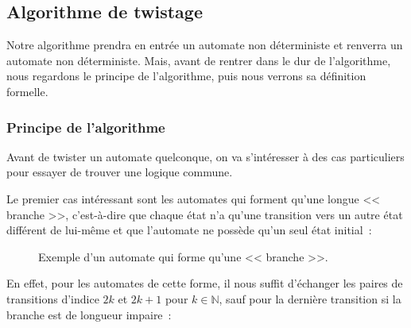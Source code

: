 \subsection{Algorithme de twistage}

Notre algorithme prendra en entrée un automate non déterministe et renverra un
automate non déterministe. Mais, avant de rentrer dans le dur de l'algorithme,
nous regardons le principe de l'algorithme, puis nous verrons sa définition
formelle.

\subsubsection{Principe de l'algorithme}

Avant de twister un automate quelconque, on va s'intéresser à des cas
particuliers pour essayer de trouver une logique commune.

\vphantom{}

Le premier cas intéressant sont les automates qui forment qu'une longue
<< branche >>, c'est-à-dire que chaque état n'a qu'une transition vers un
autre état différent de lui-même et que l'automate ne possède qu'un seul état
initial~:

\begin{figure}[H]
  \centering
  \captionsetup{type=figure,justification=centering}
  \caption{
    Exemple d'un automate qui forme qu'une << branche >>.
  }\label{fig:automate_branche}
\end{figure}

En effet, pour les automates de cette forme, il nous suffit d'échanger les
paires de transitions d'indice \(2k\) et \(2k + 1\) pour \(k \in\mathbb{N}\),
sauf pour la dernière transition si la branche est de longueur impaire~:

